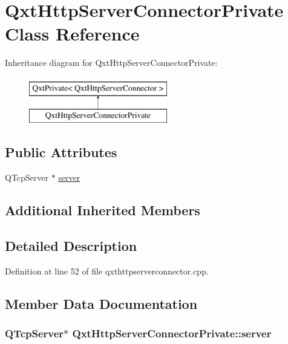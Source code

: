 \hypertarget{class_qxt_http_server_connector_private}{\section{Qxt\-Http\-Server\-Connector\-Private Class Reference}
\label{class_qxt_http_server_connector_private}
}
Inheritance diagram for Qxt\-Http\-Server\-Connector\-Private\-:\begin{figure}[H]
\begin{center}
\leavevmode
\includegraphics[height=2.000000cm]{class_qxt_http_server_connector_private}
\end{center}
\end{figure}
\subsection*{Public Attributes}
\begin{DoxyCompactItemize}
\item 
Q\-Tcp\-Server $\ast$ \hyperlink{class_qxt_http_server_connector_private_a08e1b572727191aa86db2ef13ce657bb}{server}
\end{DoxyCompactItemize}
\subsection*{Additional Inherited Members}


\subsection{Detailed Description}


Definition at line 52 of file qxthttpserverconnector.\-cpp.



\subsection{Member Data Documentation}
\hypertarget{class_qxt_http_server_connector_private_a08e1b572727191aa86db2ef13ce657bb}{
\subsubsection[{server}]{\setlength{\rightskip}{0pt plus 5cm}Q\-Tcp\-Server$\ast$ Qxt\-Http\-Server\-Connector\-Private\-::server}}\label{class_qxt_http_server_connector_private_a08e1b572727191aa86db2ef13ce657bb}


